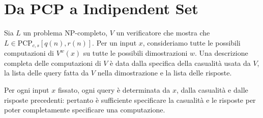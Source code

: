 \documentclass[\main/main.tex]{subfiles}
\begin{document}
\section{Da PCP a Indipendent Set}
\begin{multicols}{2}
\begin{definition}[Configurazione]
    Sia \(L\) un problema \(\mathrm{NP}\)-completo, \(V\) un verificatore che mostra che \(L \in \mathrm{PCP}_{c, s}[q(n), r(n)]\). Per un input \(x\), consideriamo tutte le possibili computazioni di \(V^{w}(x)\) su tutte le possibili dimostrazioni \(w\). Una descrizione completa delle computazioni di \(V\) è data dalla specifica della casualità usata da \(V\), la lista delle query fatta da \(V\) nella dimostrazione e la lista delle risposte.
    
    Per ogni input \(x\) fissato, ogni query è determinata da \(x\), dalla casualità e dalle risposte precedenti: pertanto è sufficiente specificare la casualità e le risposte per poter completamente specificare una computazione.
    

\end{definition}
\end{multicols}
\end{document}

